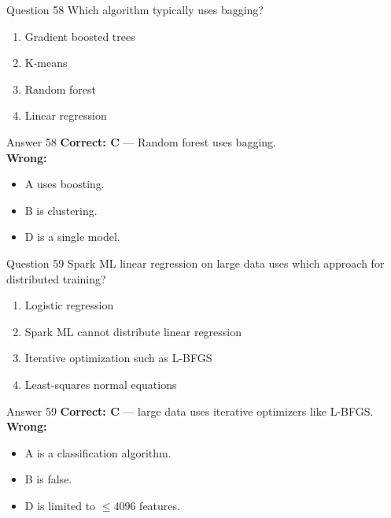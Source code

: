 \documentclass[aspectratio=169,11pt]{beamer}
\begin{document}
	\begin{frame}{Question 58}
		Which algorithm typically uses bagging?
		\begin{enumerate}[label=\Alph*.]
			\item Gradient boosted trees
			\item K-means
			\item Random forest
			\item Linear regression
		\end{enumerate}
	\end{frame}
	\begin{frame}{Answer 58}
		\textbf{Correct: C} --- Random forest uses bagging.\\
		\vspace{0.5em}
		\textbf{Wrong:}
		\begin{itemize}
			\item A uses boosting.
			\item B is clustering.
			\item D is a single model.
		\end{itemize}
	\end{frame}
	
	\begin{frame}{Question 59}
		Spark ML linear regression on large data uses which approach for distributed training?
		\begin{enumerate}[label=\Alph*.]
			\item Logistic regression
			\item Spark ML cannot distribute linear regression
			\item Iterative optimization such as L-BFGS
			\item Least-squares normal equations
		\end{enumerate}
	\end{frame}
	\begin{frame}{Answer 59}
		\textbf{Correct: C} --- large data uses iterative optimizers like L-BFGS.\\
		\vspace{0.5em}
		\textbf{Wrong:}
		\begin{itemize}
			\item A is a classification algorithm.
			\item B is false.
			\item D is limited to $\le 4096$ features.
		\end{itemize}
	\end{frame}
	
\end{document}
